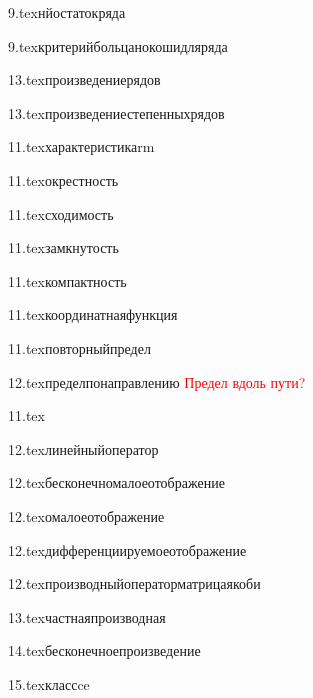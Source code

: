 {9.tex}{нйостатокряда}

{9.tex}{критерийбольцанокошидляряда}

{13.tex}{произведениерядов}

{13.tex}{произведениестепенныхрядов}

{11.tex}{характеристикаrm}

{11.tex}{окрестность}

{11.tex}{сходимость}
\label{сходимость}

{11.tex}{замкнутость}

{11.tex}{компактность}

{11.tex}{координатнаяфункция}

{11.tex}{повторныйпредел}

{12.tex}{пределпонаправлению}
\textcolor{red}{Предел вдоль пути?}

{11.tex}{}

{12.tex}{линейныйоператор}

{12.tex}{бесконечномалоеотображение}

{12.tex}{омалоеотображение}

{12.tex}{дифференциируемоеотображение}

{12.tex}{производныйоператорматрицаякоби}

{13.tex}{частнаяпроизводная}

{14.tex}{бесконечноепроизведение}

{15.tex}{классce}


